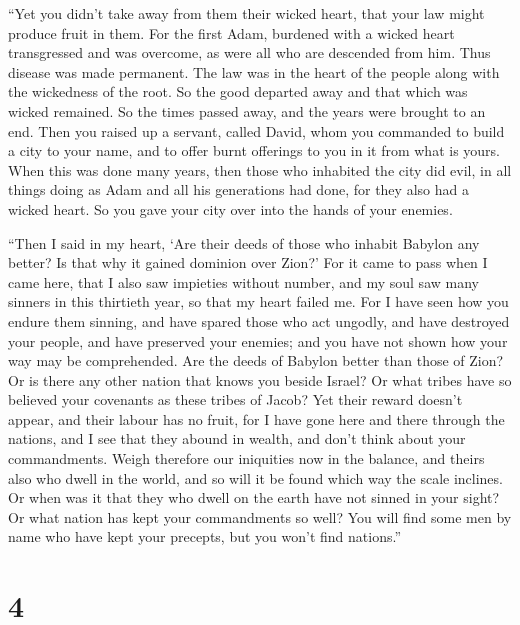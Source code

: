  ``Yet you didn't take away from them their wicked heart,
that your law might produce fruit in them.  For the first
Adam, burdened with a wicked heart transgressed and was overcome, as
were all who are descended from him.  Thus disease was made
permanent. The law was in the heart of the people along with the
wickedness of the root. So the good departed away and that which was
wicked remained.  So the times passed away, and the years
were brought to an end. Then you raised up a servant, called David,
 whom you commanded to build a city to your name, and to
offer burnt offerings to you in it from what is yours. 
When this was done many years, then those who inhabited the city did
evil,  in all things doing as Adam and all his generations
had done, for they also had a wicked heart.  So you gave
your city over into the hands of your enemies.

 ``Then I said in my heart, `Are their deeds of those who
inhabit Babylon any better? Is that why it gained dominion over Zion?'
 For it came to pass when I came here, that I also saw
impieties without number, and my soul saw many sinners in this thirtieth
year, so that my heart failed me.  For I have seen how you
endure them sinning, and have spared those who act ungodly, and have
destroyed your people, and have preserved your enemies; 
and you have not shown how your way may be comprehended. Are the deeds
of Babylon better than those of Zion?  Or is there any
other nation that knows you beside Israel? Or what tribes have so
believed your covenants as these tribes of Jacob?  Yet
their reward doesn't appear, and their labour has no fruit, for I have
gone here and there through the nations, and I see that they abound in
wealth, and don't think about your commandments.  Weigh
therefore our iniquities now in the balance, and theirs also who dwell
in the world, and so will it be found which way the scale inclines.
 Or when was it that they who dwell on the earth have not
sinned in your sight? Or what nation has kept your commandments so well?
 You will find some men by name who have kept your
precepts, but you won't find nations.''

\hypertarget{section-3}{%
\section{4}\label{section-3}}

